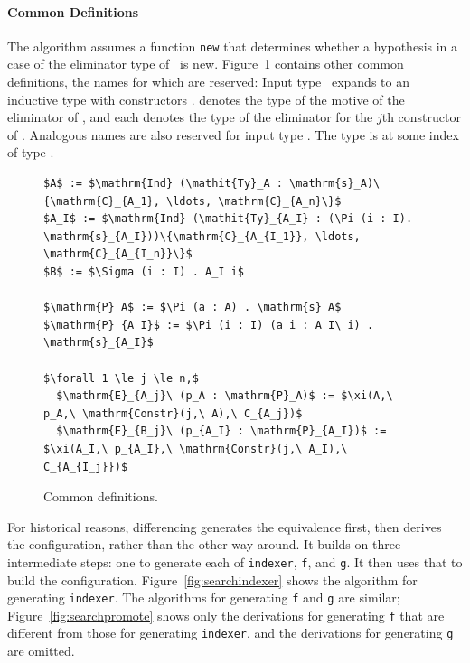
\paragraph{Common Definitions}
The algorithm assumes a function \lstinline{new} that determines whether a hypothesis in a case of the eliminator type of \AI\ is new.
Figure~\ref{fig:common} contains other common definitions, the names for which are reserved:
Input type \Aa\ expands to an inductive type with constructors
.
 denotes the type of the motive of the eliminator of \Aa,
and each  denotes the type of the eliminator for the $j$th constructor of \Aa.
Analogous names are also reserved for input type \AI.
The type \B is \AI at some index of type \I.

\begin{figure}
\begin{lstlisting}
$A$ := $\mathrm{Ind} (\mathit{Ty}_A : \mathrm{s}_A)\{\mathrm{C}_{A_1}, \ldots, \mathrm{C}_{A_n}\}$
$A_I$ := $\mathrm{Ind} (\mathit{Ty}_{A_I} : (\Pi (i : I). \mathrm{s}_{A_I}))\{\mathrm{C}_{A_{I_1}}, \ldots, \mathrm{C}_{A_{I_n}}\}$
$B$ := $\Sigma (i : I) . A_I i$

$\mathrm{P}_A$ := $\Pi (a : A) . \mathrm{s}_A$
$\mathrm{P}_{A_I}$ := $\Pi (i : I) (a_i : A_I\ i) . \mathrm{s}_{A_I}$

$\forall 1 \le j \le n,$
  $\mathrm{E}_{A_j}\ (p_A : \mathrm{P}_A)$ := $\xi(A,\ p_A,\ \mathrm{Constr}(j,\ A),\ C_{A_j})$
  $\mathrm{E}_{B_j}\ (p_{A_I} : \mathrm{P}_{A_I})$ := $\xi(A_I,\ p_{A_I},\ \mathrm{Constr}(j,\ A_I),\ C_{A_{I_j}})$
\end{lstlisting}
\vspace{-0.3cm}
\caption{Common definitions.}
\label{fig:common}
\end{figure}

For historical reasons, differencing generates the equivalence first, then derives the configuration, rather than the other way around. %
It builds on three intermediate steps: one to generate each of \lstinline{indexer},
\lstinline{f}, and \lstinline{g}.
It then uses that to build the configuration.
Figure~\ref{fig:searchindexer} shows the algorithm for generating \lstinline{indexer}.
The algorithms for generating \lstinline{f} and \lstinline{g} are similar;
Figure~\ref{fig:searchpromote} shows only the derivations for generating \lstinline{f}
that are different from those for generating \lstinline{indexer}, and 
the derivations for generating \lstinline{g} are omitted.

